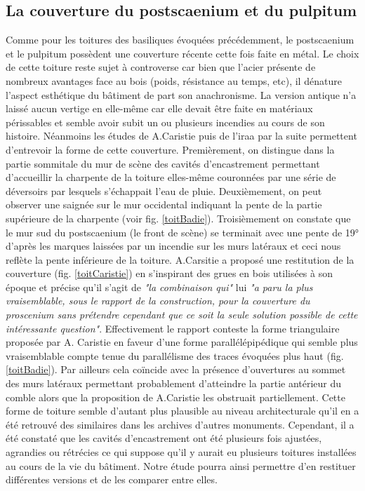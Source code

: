 		
		\subsection{La couverture du \gls{postscaenium} et du \gls{pulpitum}} \label{couverture}
		
		Comme pour les toitures des \glspl{basilique} évoquées précédemment, le \gls{postscaenium} et le \gls{pulpitum} possèdent une couverture récente cette fois faite en métal. Le choix de cette toiture reste sujet à controverse car bien que l'acier présente de nombreux avantages face au bois (poids, résistance au temps, etc), il dénature l'aspect esthétique du bâtiment de part son anachronisme. La version antique n'a laissé aucun vertige en elle-même car elle devait être faite en matériaux périssables et semble avoir subit un ou plusieurs incendies au cours de son histoire. Néanmoins les études de A.Caristie puis de l'\gls{iraa} par la suite permettent d'entrevoir la forme de cette couverture. Premièrement, on distingue dans la partie sommitale du mur de scène des cavités d'encastrement permettant d'accueillir la charpente de la toiture elles-même couronnées par une série de déversoirs par lesquels s’échappait l’eau de pluie. Deuxièmement, on peut observer une saignée sur le mur occidental indiquant la pente de la partie supérieure de la charpente (voir fig. \ref{toitBadie}). Troisièmement on constate que le mur sud du \gls{postscaenium} (le front de scène) se terminait avec une pente de 19° d'après les marques laissées par un incendie sur les murs latéraux et ceci nous reflète la pente inférieure de la toiture. A.Carsitie a proposé une restitution de la couverture (fig. \ref{toitCaristie}) en s'inspirant des grues en bois utilisées à son époque et précise qu'il s'agit de \textit{"la combinaison qui"} lui \textit{"a paru la plus vraisemblable, sous le rapport de la construction, pour la couverture du proscenium sans prétendre cependant que
ce soit la seule solution possible de cette intéressante question"}. Effectivement le rapport \cite{orangeTxt} conteste la forme triangulaire proposée par A. Caristie en faveur d'une forme parallélépipédique qui semble plus vraisemblable compte tenue du parallélisme des traces évoquées plus haut (fig. \ref{toitBadie}). Par ailleurs cela coïncide avec la présence d'ouvertures au sommet des murs latéraux permettant probablement d'atteindre la partie antérieur du comble alors que la proposition de A.Caristie les obstruait partiellement. Cette forme de toiture semble d'autant plus plausible au niveau architecturale qu'il en a été retrouvé des similaires dans les archives d'autres monuments. Cependant, il a été constaté que les cavités d'encastrement ont été plusieurs fois ajustées, agrandies ou rétrécies ce qui suppose qu'il y aurait eu plusieurs toitures installées au cours de la vie du bâtiment. Notre étude pourra ainsi permettre d'en restituer différentes versions et de les comparer entre elles.
		
